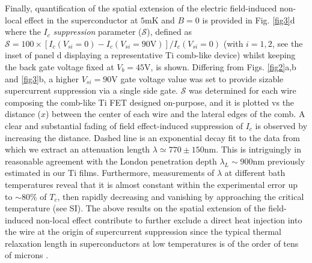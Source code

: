 \documentclass[prl,twocolumn,reprint,graphicx,showpacs,superscriptaddress,floatfix]{revtex4-1}
\begin{document}
Finally, quantification of the spatial extension of the electric field-induced non-local effect in the superconductor at $5$mK and $B=0$ is provided in Fig. \ref{fig3}d where the $I_c$  \emph{suppression} parameter ($\mathcal {S}$), defined as $\mathcal {S}=100\times [I_c(V_{si}=0)-I_c(V_{si}=90\text{V})]/I_c(V_{si}=0)$ (with $i=1,2$, see the inset of panel d displaying a representative Ti comb-like device) whilst keeping the back gate voltage fixed at $V_b=45$V, is shown. 
Differing from Figs. \ref{fig2}a,b and \ref{fig3}b, a higher $V_{si}=90\text{V}$ gate voltage value  was set to provide sizable supercurrent suppression via a single side gate.
$\mathcal {S}$ was determined for each wire composing the comb-like Ti FET designed on-purpose, and it is plotted vs the distance ($x$) between the center of each wire and the lateral
edges of the comb.  
A clear and substantial fading of field effect-induced suppression of $I_c$ is observed by increasing the distance.
Dashed line is an exponential decay fit to the data from which we extract an attenuation length $\lambda \simeq 770\pm 150$nm. 
This is intriguingly in reasonable agreement with the London penetration depth $\lambda_L\sim 900$nm previously estimated in our Ti films. 
Furthermore, measurements of $\lambda$ at different bath temperatures reveal that it is almost constant within the experimental error up to $\sim 80\%$ of $T_c$, then rapidly decreasing and vanishing by approaching the critical temperature (see SI).
The above results on the spatial extension of the field-induced non-local effect contribute to further exclude a direct heat injection into the wire at the origin of supercurrent suppression since the typical thermal relaxation length in superconductors at low temperatures is of the order of tens of microns  \cite{Fornieri2017_2}.
\end{document}
